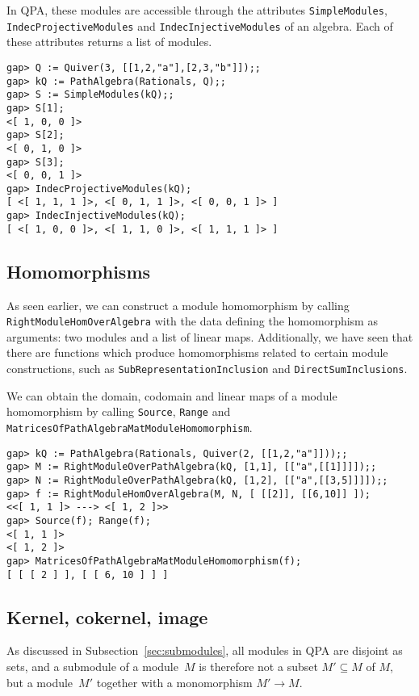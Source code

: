 \documentclass{amsart}
\theoremstyle{definition}
\theoremstyle{theoretic}
\begin{document}
In QPA, these modules are accessible through the attributes
\texttt{SimpleModules}, \texttt{IndecProjectiveModules} and
\texttt{IndecInjectiveModules} of an algebra.  Each of these
attributes returns a list of modules.
\begin{verbatim}
gap> Q := Quiver(3, [[1,2,"a"],[2,3,"b"]]);;
gap> kQ := PathAlgebra(Rationals, Q);;
gap> S := SimpleModules(kQ);;
gap> S[1];
<[ 1, 0, 0 ]>
gap> S[2];
<[ 0, 1, 0 ]>
gap> S[3];
<[ 0, 0, 1 ]>
gap> IndecProjectiveModules(kQ);
[ <[ 1, 1, 1 ]>, <[ 0, 1, 1 ]>, <[ 0, 0, 1 ]> ]
gap> IndecInjectiveModules(kQ);
[ <[ 1, 0, 0 ]>, <[ 1, 1, 0 ]>, <[ 1, 1, 1 ]> ]
\end{verbatim}

\subsection{Homomorphisms}

As seen earlier, we can construct a module homomorphism by calling
\texttt{RightModuleHomOverAlgebra} with the data defining the
homomorphism as arguments: two modules and a list of linear maps.
Additionally, we have seen that there are functions which produce
homomorphisms related to certain module constructions, such as
\texttt{SubRepresentationInclusion} and \texttt{DirectSumInclusions}.

We can obtain the domain, codomain and linear maps of a module
homomorphism by calling \texttt{Source}, \texttt{Range} and
\texttt{MatricesOfPathAlgebraMatModuleHomomorphism}.

\begin{verbatim}
gap> kQ := PathAlgebra(Rationals, Quiver(2, [[1,2,"a"]]));;
gap> M := RightModuleOverPathAlgebra(kQ, [1,1], [["a",[[1]]]]);;
gap> N := RightModuleOverPathAlgebra(kQ, [1,2], [["a",[[3,5]]]]);;
gap> f := RightModuleHomOverAlgebra(M, N, [ [[2]], [[6,10]] ]);
<<[ 1, 1 ]> ---> <[ 1, 2 ]>>
gap> Source(f); Range(f);
<[ 1, 1 ]>
<[ 1, 2 ]>
gap> MatricesOfPathAlgebraMatModuleHomomorphism(f);
[ [ [ 2 ] ], [ [ 6, 10 ] ] ]
\end{verbatim}


\subsection{Kernel, cokernel, image}

As discussed in Subsection~\ref{sec:submodules}, all modules in QPA
are disjoint as sets, and a submodule of a module~$M$ is therefore not
a subset $M' \subseteq M$ of $M$, but a module~$M'$ together with a
monomorphism $M' \to M$.
\end{document}
